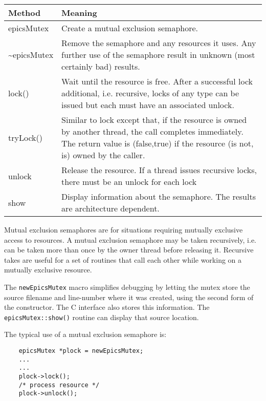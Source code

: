 \begin{center}
\begin{longtable}{p{1.25in}p{4.5in}}
\textbf{Method} & \textbf{Meaning}\\
\hline
epicsMutex &
Create a mutual exclusion semaphore.\\

\~{}epicsMutex &
Remove the semaphore and any resources it uses.
Any further use of the semaphore result in unknown (most certainly bad) results.\\

lock() &
Wait until the resource is free.
After a successful lock additional, i.e. recursive, locks of any type can be issued but each must have an associated unlock.\\

tryLock() &
Similar to lock except that, if the resource is owned by another thread, the call completes immediately.
The return value is (false,true) if the resource (is not, is) owned by the caller.\\

unlock &
Release the resource.
If a thread issues recursive locks, there must be an unlock for each lock\\

show &
Display information about the semaphore.
The results are architecture dependent.
\end{longtable}

\end{center}


Mutual exclusion semaphores are for situations requiring mutually exclusive access to resources.
A mutual exclusion semaphore may be taken recursively, i.e. can be taken more than once by the owner thread before releasing it.
Recursive takes are useful for a set of routines that call each other while working on a mutually exclusive resource.

The \verb|newEpicsMutex| macro simplifies debugging by letting the mutex store the source filename and line-number where it was created, using the second form of the constructor.
The C interface also stores this information.
The \verb|epicsMutex::show()| routine can display that source location.

The typical use of a mutual exclusion semaphore is:

\begin{verbatim}
    epicsMutex *plock = newEpicsMutex;
    ...
    ...
    plock->lock();
    /* process resource */
    plock->unlock();
\end{verbatim}

